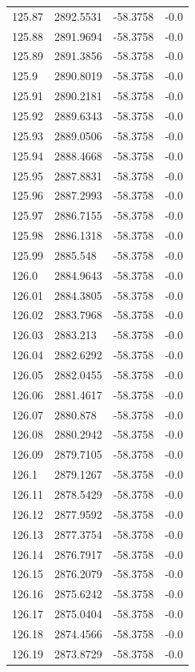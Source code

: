 \begin{table}[H]
\begin{tabular}{llll}
125.87 & 2892.5531 & -58.3758 & -0.0 \\
125.88 & 2891.9694 & -58.3758 & -0.0 \\
125.89 & 2891.3856 & -58.3758 & -0.0 \\
125.9 & 2890.8019 & -58.3758 & -0.0 \\
125.91 & 2890.2181 & -58.3758 & -0.0 \\
125.92 & 2889.6343 & -58.3758 & -0.0 \\
125.93 & 2889.0506 & -58.3758 & -0.0 \\
125.94 & 2888.4668 & -58.3758 & -0.0 \\
125.95 & 2887.8831 & -58.3758 & -0.0 \\
125.96 & 2887.2993 & -58.3758 & -0.0 \\
125.97 & 2886.7155 & -58.3758 & -0.0 \\
125.98 & 2886.1318 & -58.3758 & -0.0 \\
125.99 & 2885.548 & -58.3758 & -0.0 \\
126.0 & 2884.9643 & -58.3758 & -0.0 \\
126.01 & 2884.3805 & -58.3758 & -0.0 \\
126.02 & 2883.7968 & -58.3758 & -0.0 \\
126.03 & 2883.213 & -58.3758 & -0.0 \\
126.04 & 2882.6292 & -58.3758 & -0.0 \\
126.05 & 2882.0455 & -58.3758 & -0.0 \\
126.06 & 2881.4617 & -58.3758 & -0.0 \\
126.07 & 2880.878 & -58.3758 & -0.0 \\
126.08 & 2880.2942 & -58.3758 & -0.0 \\
126.09 & 2879.7105 & -58.3758 & -0.0 \\
126.1 & 2879.1267 & -58.3758 & -0.0 \\
126.11 & 2878.5429 & -58.3758 & -0.0 \\
126.12 & 2877.9592 & -58.3758 & -0.0 \\
126.13 & 2877.3754 & -58.3758 & -0.0 \\
126.14 & 2876.7917 & -58.3758 & -0.0 \\
126.15 & 2876.2079 & -58.3758 & -0.0 \\
126.16 & 2875.6242 & -58.3758 & -0.0 \\
126.17 & 2875.0404 & -58.3758 & -0.0 \\
126.18 & 2874.4566 & -58.3758 & -0.0 \\
126.19 & 2873.8729 & -58.3758 & -0.0 \\

\end{tabular}
\end{table}

